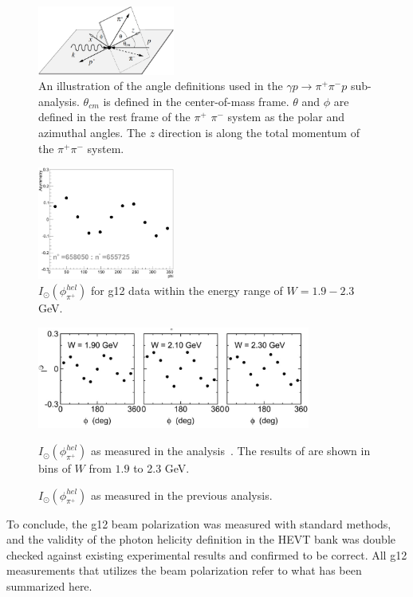 \begin{figure}[htpb]
\begin{center}
 \includegraphics[width=0.4\textwidth]{figures/calib/pol/ioplane.eps}
  \caption{An illustration of the angle definitions used in the $\gamma p \to \pi^+ \pi^- p$ sub-analysis. $\theta_{cm}$ is defined in the center-of-mass frame. $\theta$ and $\phi$ are defined in the rest frame of the $\pi^+$ $\pi^-$ system as the polar and azimuthal angles. The $z$ direction is along the total momentum of the $\pi^+ \pi^-$ system.}
  \label{ioplane}
  \end{center}
\end{figure}


\begin{figure}[htpb]
\begin{center}
 \includegraphics[width=0.4\textwidth]{figures/calib/pol/myIo.eps}
  \caption{$I_{\odot}(\phi^{hel}_{\pi^+})$ for g12 data within the energy range of $W = 1.9-2.3$ GeV.}
  \label{myIo}
  \end{center}
\end{figure}


\begin{figure}[htpb]
\begin{center}
 \includegraphics[width=0.8\textwidth]{figures/calib/pol/Io.eps}
  \caption{$I_{\odot}(\phi^{hel}_{\pi^+})$ as measured in the previous analysis.}{ $I_{\odot}(\phi^{hel}_{\pi^+})$ as measured in the analysis~\cite{Io}. The results of are shown in bins of $W$ from $1.9$ to 2.3 GeV.}
  \label{Io}
  \end{center}
\end{figure}




To conclude, the g12 beam polarization was measured with standard methods, and the validity of the photon helicity definition in the HEVT bank was double checked against existing experimental results and confirmed to be correct. All g12 measurements that utilizes the beam polarization refer to what has been summarized here.



